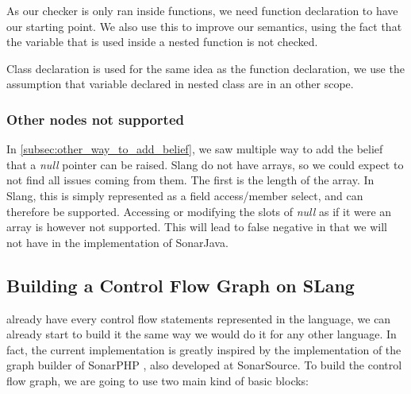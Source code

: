 As our checker is only ran inside functions, we need function declaration to have our starting point. 
We also use this to improve our semantics, using the fact that the variable that is used inside a nested function is not checked.

Class declaration is used for the same idea as the function declaration, we use the assumption that variable declared in nested class are in an other scope.


\subsubsection{Other nodes not supported}
\label{subsubsec:other_nodes_not_supported}

In \ref{subsec:other_way_to_add_belief}, we saw multiple way to add the belief that a \emph{null} pointer can be raised. 
Slang do not have arrays, so we could expect to not find all issues coming from them. 
The first is the length of the array. In Slang, this is simply represented as a field access/member select, and can therefore be supported. 
Accessing or modifying the slots of \emph{null} as if it were an array is however not supported. This will lead to false negative in \slang{} that we will not have in the implementation of SonarJava.

\subsection{Building a Control Flow Graph on SLang}
\label{subsec:cfg_on_slang}

\slang{} already have every control flow statements represented in the language, we can already start to build it the same way we would do it for any other language. 
In fact, the current implementation is greatly inspired by the implementation of the graph builder of SonarPHP \cite{SonarPHP:2019:Online}, also developed at SonarSource. 
To build the control flow graph, we are going to use two main kind of basic blocks:

